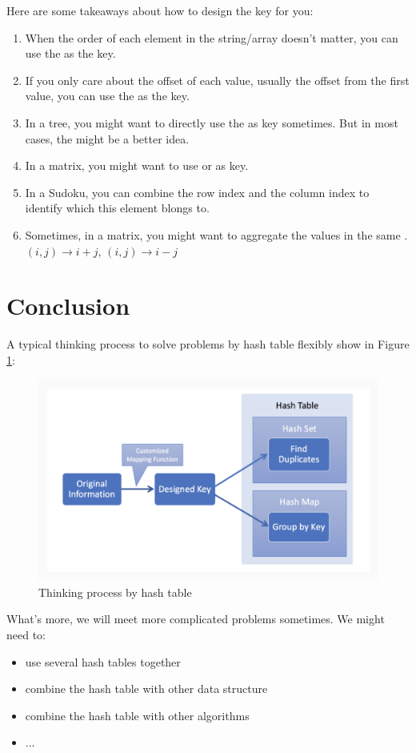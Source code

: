 Here are some takeaways about how to design the key for you:
\begin{enumerate}
\item When the order of each element in the string/array doesn't matter, you can use the  as the key.
\item If you only care about the offset of each value, usually the offset from the first value, you can use the  as the key.
\item In a tree, you might want to directly use the  as key sometimes. But in most cases, the  might be a better idea.
\item In a matrix, you might want to use  or  as key.
\item In a Sudoku, you can combine the row index and the column index to identify which  this element blongs to.
\item Sometimes, in a matrix, you might want to aggregate the values in the same . $(i,j) \rightarrow i+j$, $(i,j) \rightarrow i-j$
\end{enumerate}



\section{Conclusion}

A typical thinking process to solve problems by hash table flexibly show in Figure \ref{fig:how-to-apply-hash-table}:
\begin{figure}[!ht]
  \centering
  \includegraphics[width=\textwidth]{pics/how-to-apply-hash-table}
  \caption{Thinking process by hash table}
  \label{fig:how-to-apply-hash-table}
\end{figure}



What's more, we will meet more complicated problems sometimes. We might need to:

\begin{itemize}
\item use several hash tables together
\item combine the hash table with other data structure
\item combine the hash table with other algorithms
\item ...
\end{itemize}
